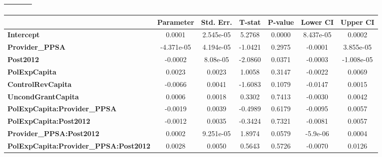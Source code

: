 \begin{center}
\begin{tabular}{lclc}
\textbf{}                                     &                    & \textbf{                     }   &                  \\
\bottomrule
\end{tabular}
\begin{tabular}{lcccccc}
                                              & \textbf{Parameter} & \textbf{Std. Err.} & \textbf{T-stat} & \textbf{P-value} & \textbf{Lower CI} & \textbf{Upper CI}  \\
\midrule
\textbf{Intercept}                            &       0.0001       &     2.545e-05      &      5.2768     &      0.0000      &     8.437e-05     &       0.0002       \\
\textbf{Provider\_PPSA}                       &     -4.371e-05     &     4.194e-05      &     -1.0421     &      0.2975      &      -0.0001      &     3.855e-05      \\
\textbf{Post2012}                             &      -0.0002       &      8.08e-05      &     -2.0860     &      0.0371      &      -0.0003      &     -1.008e-05     \\
\textbf{PolExpCapita}                         &       0.0023       &       0.0023       &      1.0058     &      0.3147      &      -0.0022      &       0.0069       \\
\textbf{ControlRevCapita}                     &      -0.0066       &       0.0041       &     -1.6083     &      0.1079      &      -0.0147      &       0.0015       \\
\textbf{UncondGrantCapita}                    &       0.0006       &       0.0018       &      0.3302     &      0.7413      &      -0.0030      &       0.0042       \\
\textbf{PolExpCapita:Provider\_PPSA}          &      -0.0019       &       0.0039       &     -0.4989     &      0.6179      &      -0.0095      &       0.0057       \\
\textbf{PolExpCapita:Post2012}                &      -0.0012       &       0.0035       &     -0.3424     &      0.7321      &      -0.0081      &       0.0057       \\
\textbf{Provider\_PPSA:Post2012}              &       0.0002       &     9.251e-05      &      1.8974     &      0.0579      &      -5.9e-06     &       0.0004       \\
\textbf{PolExpCapita:Provider\_PPSA:Post2012} &       0.0028       &       0.0050       &      0.5643     &      0.5726      &      -0.0070      &       0.0126       \\
\bottomrule
\end{tabular}
\end{center}